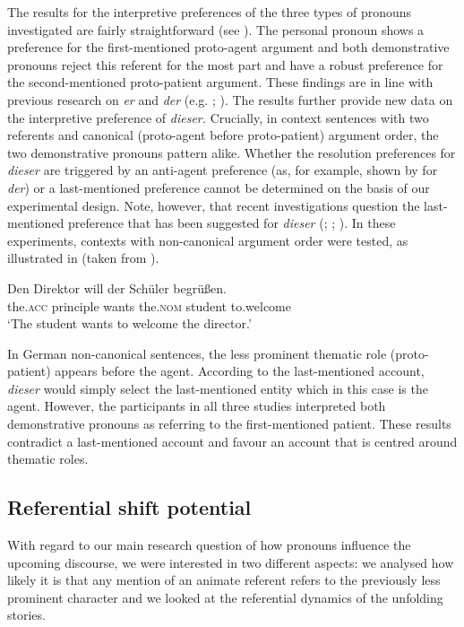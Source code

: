 \documentclass[output=paper,colorlinks,citecolor=brown]{langscibook}
\begin{document}
The results for the interpretive preferences of the three types of pronouns investigated are fairly straightforward (see ). The personal pronoun shows a preference for the first-mentioned proto-agent argument and both demonstrative pronouns reject this referent for the most part and have a robust preference for the second-mentioned proto-patient argument. These findings are in line with previous research on \textit{er} and \textit{der} (e.g. \citealt{BoschEtAl2003}; \citealt{SchumacherEtAl2016}). The results further provide new data on the interpretive preference of \textit{dieser.} Crucially, in context sentences with two referents and canonical (proto-agent before proto-patient) argument order, the two demonstrative pronouns pattern alike. Whether the resolution preferences for \textit{dieser} are triggered by an anti-agent preference (as, for example, shown by \citealt{SchumacherEtAl2016} for \textit{der}) or a last-mentioned preference \citep{ZifonunEtAl1997} cannot be determined on the basis of our experimental design. Note, however, that recent investigations question the last-mentioned preference that has been suggested for \textit{dieser} (\citealt{Lange2016}; \citealt{Özden2016}; \citealt{PatilEtAl2020}). In these experiments, contexts with non-canonical argument order were tested, as illustrated in  (taken from \citealt{Özden2016}).

\ea\label{ex:fuchs:6}
\gll Den Direktor will der Schüler begrüßen. \\
     the.\textsc{acc} principle wants the.\textsc{nom} student to.welcome\\
\glt ‘The student wants to welcome the director.’
\z

In German non-canonical sentences, the less prominent thematic role (proto-patient) appears before the agent. According to the last-mentioned account, \textit{dieser} would simply select the last-mentioned entity which in this case is the agent. However, the participants in all three studies interpreted both demonstrative pronouns as referring to the first-mentioned patient. These results contradict a last-mentioned account and favour an account that is centred around thematic roles.

\subsection{Referential shift potential}\label{sec:fuchs:3.2}

With regard to our main research question of how pronouns influence the upcoming discourse, we were interested in two different aspects: we analysed how likely it is that any mention of an animate referent refers to the previously less prominent character and we looked at the referential dynamics of the unfolding stories. 
\end{document}
